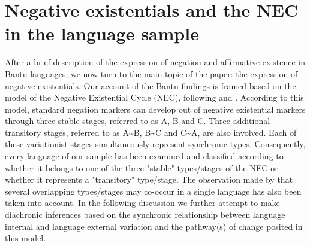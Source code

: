\documentclass[output=paper,draft,draftmode,colorlinks,citecolor=brown]{langscibook}
\begin{document}
\section{Negative existentials and the NEC in the language sample}\label{sec:1:4}
After a brief description of the expression of negation and affirmative
existence in Bantu languages, we now turn to the main topic of the paper: the expression of negative existentials. Our account of the Bantu findings
is framed based on the model of the Negative Existential Cycle
(NEC), following \citet{Croft1991} and
\textcites{Veselinova2013}{Veselinova2014}{Veselinova2016}. According to this
model, standard negation markers can develop out of negative existential
markers through three stable stages, referred to as A, B and C. Three
additional transitory stages, referred to as A{\textasciitilde}B,
B{\textasciitilde}C and C{\textasciitilde}A, are also involved. Each of
these variationist stages simultaneously represent synchronic types.
Consequently, every language of our sample has been examined and classified
according to whether it belongs to one of the three "stable" types/stages
of the NEC or whether it represents a "transitory" type/stage. The
observation made by \textcites{Veselinova2014,Veselinova2016} that several
overlapping types/stages may co-occur in a single language has also been
taken into account. In the following discussion we further attempt to make
diachronic inferences based on the synchronic relationship between language
internal and language external variation and the pathway(s) of change posited in this model.
\end{document}
